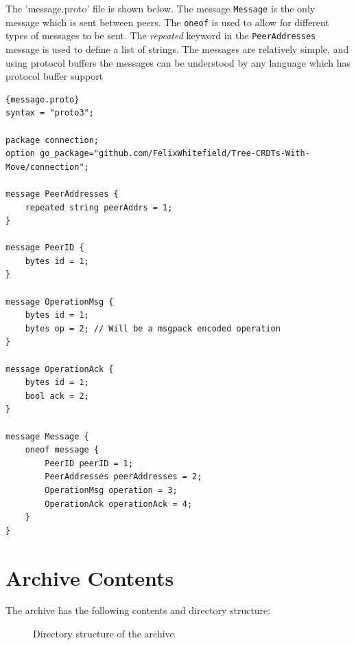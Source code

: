\documentclass[12pt]{report}
\begin{document}
The 'message.proto' file is shown below. The message \texttt{Message} is the only message which is sent between peers. The \texttt{oneof} is used to allow for different types of messages to be sent. The \textit{repeated} keyword in the \texttt{PeerAddresses} message is used to define a list of strings. The messages are relatively simple, and using protocol buffers the messages can be understood by any language which has protocol buffer support 

\begin{lstlisting}[language=protobuf3, style=protobuf]{message.proto}
syntax = "proto3";

package connection;
option go_package="github.com/FelixWhitefield/Tree-CRDTs-With-Move/connection";

message PeerAddresses {
    repeated string peerAddrs = 1;
}

message PeerID {
    bytes id = 1;
}

message OperationMsg {
    bytes id = 1; 
    bytes op = 2; // Will be a msgpack encoded operation
}

message OperationAck {
    bytes id = 1;
    bool ack = 2;
}

message Message {
    oneof message {
        PeerID peerID = 1;
        PeerAddresses peerAddresses = 2;
        OperationMsg operation = 3;
        OperationAck operationAck = 4;
    }
}
\end{lstlisting}

\chapter{Archive Contents}

The archive has the following contents and directory structure:
\begin{figure}[h]
    \caption{Directory structure of the archive}
\end{figure}


\end{document}

